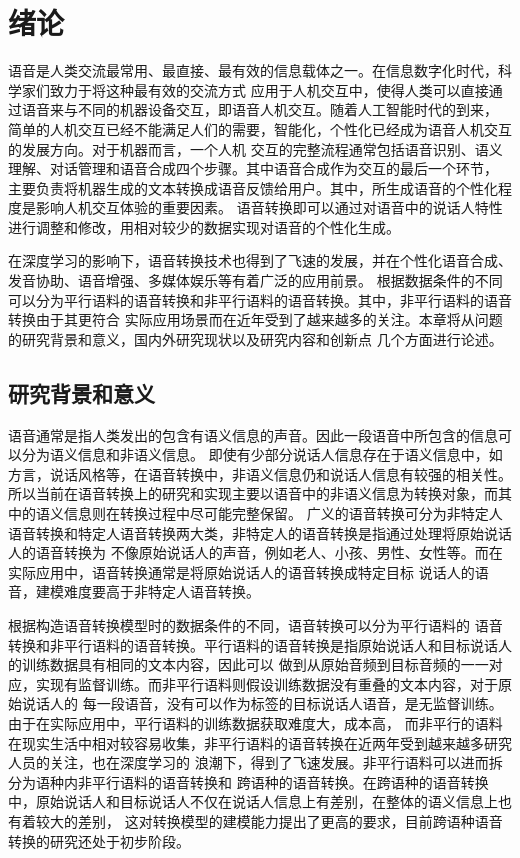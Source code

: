\chapter{绪论}
语音是人类交流最常用、最直接、最有效的信息载体之一。在信息数字化时代，科学家们致力于将这种最有效的交流方式
应用于人机交互中，使得人类可以直接通过语音来与不同的机器设备交互，即语音人机交互。随着人工智能时代的到来，
简单的人机交互已经不能满足人们的需要，智能化，个性化已经成为语音人机交互的发展方向。对于机器而言，一个人机
交互的完整流程通常包括语音识别、语义理解、对话管理和语音合成四个步骤。其中语音合成作为交互的最后一个环节，
主要负责将机器生成的文本转换成语音反馈给用户。其中，所生成语音的个性化程度是影响人机交互体验的重要因素。
语音转换即可以通过对语音中的说话人特性进行调整和修改，用相对较少的数据实现对语音的个性化生成。

在深度学习的影响下，语音转换技术也得到了飞速的发展，并在个性化语音合成、发音协助、语音增强、多媒体娱乐等有着广泛的应用前景。
根据数据条件的不同可以分为平行语料的语音转换和非平行语料的语音转换。其中，非平行语料的语音转换由于其更符合
实际应用场景而在近年受到了越来越多的关注。本章将从问题的研究背景和意义，国内外研究现状以及研究内容和创新点
几个方面进行论述。

\section{研究背景和意义}
语音通常是指人类发出的包含有语义信息的声音。因此一段语音中所包含的信息可以分为语义信息和非语义信息\cite{kinnunen2010overview, 刘蕊2009发声的生理结构和嗓音的保护}。
即使有少部分说话人信息存在于语义信息中，如方言，说话风格等，在语音转换中，非语义信息仍和说话人信息有较强的相关性\cite{Nurminen12}。
所以当前在语音转换上的研究和实现主要以语音中的非语义信息为转换对象，而其中的语义信息则在转换过程中尽可能完整保留。
广义的语音转换可分为非特定人语音转换和特定人语音转换两大类，非特定人的语音转换是指通过处理将原始说话人的语音转换为
不像原始说话人的声音，例如老人、小孩、男性、女性等。而在实际应用中，语音转换通常是将原始说话人的语音转换成特定目标
说话人的语音，建模难度要高于非特定人语音转换。

根据构造语音转换模型时的数据条件的不同，语音转换可以分为平行语料的
语音转换和非平行语料的语音转换。平行语料的语音转换是指原始说话人和目标说话人的训练数据具有相同的文本内容，因此可以
做到从原始音频到目标音频的一一对应，实现有监督训练。而非平行语料则假设训练数据没有重叠的文本内容，对于原始说话人的
每一段语音，没有可以作为标签的目标说话人语音，是无监督训练。由于在实际应用中，平行语料的训练数据获取难度大，成本高，
而非平行的语料在现实生活中相对较容易收集，非平行语料的语音转换在近两年受到越来越多研究人员的关注，也在深度学习的
浪潮下，得到了飞速发展。非平行语料可以进而拆分为语种内非平行语料的语音转换和
跨语种的语音转换。在跨语种的语音转换中，原始说话人和目标说话人不仅在说话人信息上有差别，在整体的语义信息上也有着较大的差别，
这对转换模型的建模能力提出了更高的要求，目前跨语种语音转换的研究还处于初步阶段。

